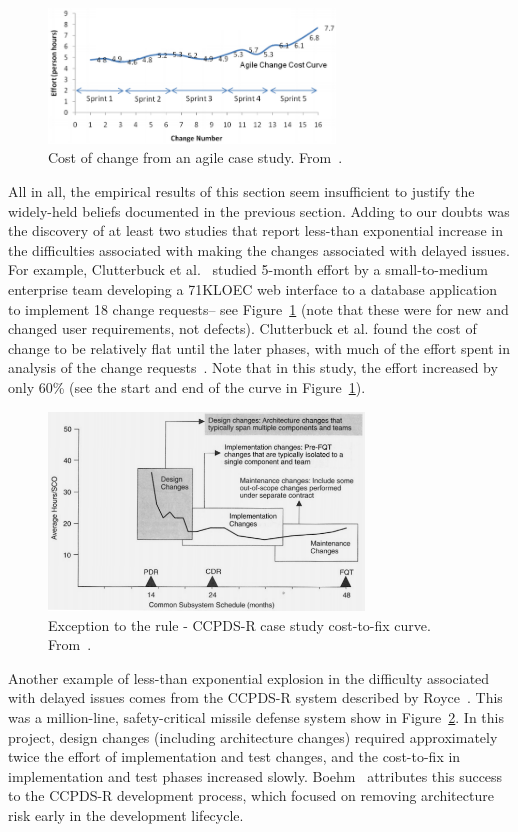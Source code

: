 \begin{figure}[!b]
 \includegraphics[width=3in]{img/clutterbuck.png} 
 \caption{Cost of change from an agile case study. From~\cite{Clutterbuck09}.}\label{fig:clutterbuck}
 \end{figure}

 
 
 All in all, the empirical results of this section seem insufficient to justify
 the widely-held beliefs documented in the previous section. Adding to our doubts
 was the discovery of at least two studies that report less-than exponential
 increase in the difficulties associated with making the changes associated with delayed
 issues. For example,
Clutterbuck et al.~\cite{Clutterbuck09} studied 5-month effort by a small-to-medium enterprise team developing a 71KLOEC web interface to a database application to implement 18 change requests-- see Figure~\ref{fig:clutterbuck} (note that these were for new and changed user requirements, not defects). Clutterbuck et al. found the cost of change to be relatively flat until the later phases, with much of the effort spent in analysis of the change requests~\cite{Clutterbuck09}. Note that in this study, the effort increased by only 60\% (see the start and end of the curve in Figure~\ref{fig:clutterbuck}).



\begin{figure}
 \includegraphics[width=3.3in]{img/Royce98.png}
 \caption{Exception to the rule - CCPDS-R case study cost-to-fix curve. From~\cite{Royce98}.}\label{fig:royce}
 \end{figure}
 
Another example of less-than exponential explosion in the difficulty associated with delayed issues comes from the  CCPDS-R
system described by Royce~\cite{Royce98}. This was a million-line, safety-critical missile defense system show in Figure~\ref{fig:royce}. In this project, design changes (including architecture changes) required approximately twice the effort of implementation and test changes, and the cost-to-fix in implementation and test phases increased slowly. Boehm~\cite{Boehm10} attributes this success to the CCPDS-R development process, which focused on removing architecture risk early in the development lifecycle.
 